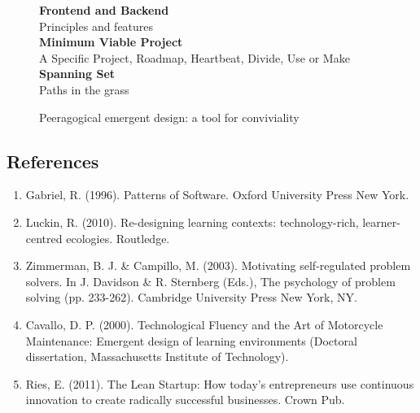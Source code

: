\begin{figure}
\begin{center}
\textbf{Frontend and Backend} \\ Principles and features\\[.1in]

\textbf{Minimum Viable Project} \\ A Specific Project, Roadmap, Heartbeat, Divide, Use or Make\\[.1in]

\textbf{Spanning Set}\\ Paths in the grass
\end{center}
\caption*{Peeragogical emergent design: a tool for conviviality}
\end{figure}



\subsection{References}

\begin{enumerate}
\item
  Gabriel, R. (1996). Patterns of Software. Oxford University Press New
  York.
\item
  Luckin, R. (2010). Re-designing learning contexts: technology-rich,
  learner-centred ecologies. Routledge.
\item
  Zimmerman, B. J. \& Campillo, M. (2003). Motivating self-regulated
  problem solvers. In J. Davidson \& R. Sternberg (Eds.), The psychology
  of problem solving (pp. 233-262). Cambridge University Press New York,
  NY.
\item
  Cavallo, D. P. (2000). Technological Fluency and the Art of Motorcycle
  Maintenance: Emergent design of learning environments (Doctoral
  dissertation, Massachusetts Institute of Technology).
\item
  Ries, E. (2011). The Lean Startup: How today's entrepreneurs use
  continuous innovation to create radically successful businesses. Crown
  Pub.
\end{enumerate}

